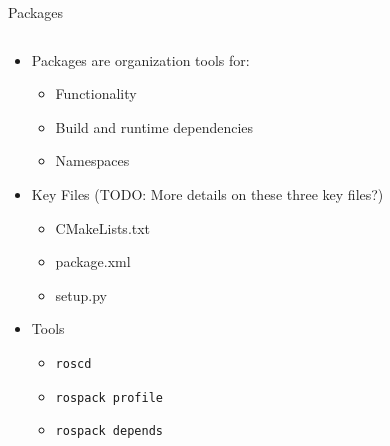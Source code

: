 \documentclass[aspectratio=43]{beamer}
\newcommand{\pyinline}[1]{\texttt{#1}}
\begin{document}

\begin{frame}{Packages}
	\begin{columns}
		\begin{column}{0.6\textwidth}
			\begin{itemize}
				\item Packages are organization tools for:
				\begin{itemize}
					\item Functionality
					\item Build and runtime dependencies
					\item Namespaces
				\end{itemize}
				\item Key Files (TODO: More details on these three key files?)
				\begin{itemize}
					\item CMakeLists.txt
					\item package.xml
					\item setup.py
				\end{itemize}
				\item Tools
				\begin{itemize}
					\item \texttt{roscd}
					\item \texttt{rospack profile}
					\item \texttt{rospack depends}
				\end{itemize}
			\end{itemize}
		\end{column}
		\begin{column}{0.4\textwidth}
			\centering

\end{column}
\end{columns}
\end{frame}
\end{document}
